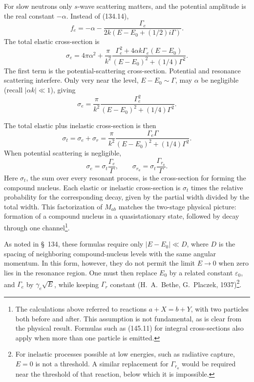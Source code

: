 For slow neutrons only $s$-wave scattering matters, and the potential
amplitude is the real constant $-\alpha$. Instead of (134.14),
\begin{equation}
 f_e=-\alpha-\frac{\Gamma_e}{2k(E-E_0+(1/2)i\Gamma)}.
 \tag{145.14}
\end{equation}
The total elastic cross-section is
\begin{equation}
 \sigma_e=4\pi\alpha^2+\frac\pi{k^2}
 \frac{\Gamma_e^2+4\alpha k\Gamma_e(E-E_0)}{(E-E_0)^2+(1/4)\Gamma^2}.
 \tag{145.15}
\end{equation}
The first term is the potential-scattering cross-section. Potential and
resonance scattering interfere. Only very near the level,
$E-E_0\sim\Gamma$, may $\alpha$ be negligible (recall
$|\alpha k|\ll1$), giving
\begin{equation}
 \sigma_e=\frac\pi{k^2}\frac{\Gamma_e^2}{(E-E_0)^2+(1/4)\Gamma^2}.
 \tag{145.16}
\end{equation}

The total elastic plus inelastic cross-section is then
\begin{equation}
 \sigma_t=\sigma_e+\sigma_r=\frac\pi{k^2}
 \frac{\Gamma_e\Gamma}{(E-E_0)^2+(1/4)\Gamma^2}.
 \tag{145.17}
\end{equation}
When potential scattering is negligible,
\[
 \sigma_e=\sigma_t\frac{\Gamma_e}{\Gamma},\qquad
 \sigma_{r_a}=\sigma_t\frac{\Gamma_{r_a}}{\Gamma}.
\]
Here $\sigma_t$, the sum over every resonant process, is the cross-section for
forming the compound nucleus. Each elastic or inelastic cross-section is
$\sigma_t$ times the relative probability for the corresponding decay,
given by the partial width divided by the total width. This factorization of
$M_{ab}$ matches the two-stage physical picture: formation of a compound
nucleus in a quasistationary state, followed by decay through one
channel\footnote{The calculations above referred to reactions
$a+X=b+Y$, with two particles both before and after. This assumption is not
fundamental, as is clear from the physical result. Formulas such as (145.11)
for integral cross-sections also apply when more than one particle is emitted.}.

As noted in \S~134, these formulas require only
$|E-E_0|\ll D$, where $D$ is the spacing of neighboring compound-nucleus
levels with the same angular momentum. In this form, however, they do not
permit the limit $E\to0$ when zero lies in the resonance region. One must then
replace $E_0$ by a related constant $\varepsilon_0$, and
$\Gamma_e$ by $\gamma_e\sqrt E$, while keeping $\Gamma_r$ constant
(H.~A.~Bethe, G.~Placzek, 1937)\footnote{For inelastic processes possible at
low energies, such as radiative capture, $E=0$ is not a threshold. A similar
replacement for $\Gamma_{r_a}$ would be required near the threshold of that
reaction, below which it is impossible.}.

